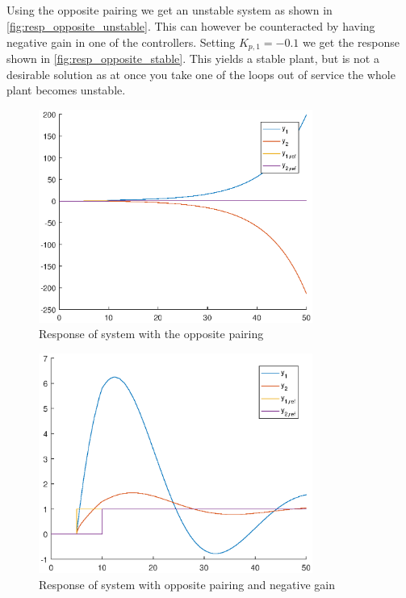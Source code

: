 \documentclass[a4paper]{scrartcl}
\begin{document}
\subsection{}
Using the opposite pairing we get an unstable system as shown in \autoref{fig:resp_opposite_unstable}. This can however be counteracted by having negative gain in one of the controllers. Setting $K_{p,1} = -0.1$ we get the response shown in \autoref{fig:resp_opposite_stable}. This yields a stable plant, but is not a desirable solution as at once you take one of the loops out of service the whole plant becomes unstable.
\begin{figure}[ht!]
	\centering
	\includegraphics[width=0.8\textwidth]{fig/resp_oppositepairing_unstable.eps}
	\caption{Response of system with the opposite pairing}
	\label{fig:resp_opposite_unstable}
\end{figure}

\begin{figure}[ht!]
	\centering
	\includegraphics[width=0.8\textwidth]{fig/resp_oppositepairing_stable.eps}
	\caption{Response of system with opposite pairing and negative gain}
	\label{fig:resp_opposite_stable}
\end{figure}
\end{document}
